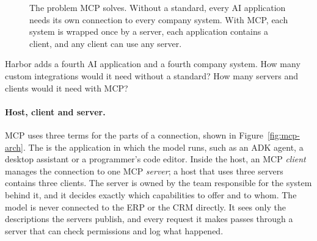 \begin{figure}[htbp]
\caption{The problem MCP solves. Without a standard, every AI application needs its own connection to every company system. With MCP, each system is wrapped once by a server, each application contains a client, and any client can use any server.}
\label{fig:mcp-nm}
\end{figure}

\begin{quickcheck}
Harbor adds a fourth AI application and a fourth company system. How many custom integrations would it need without a standard? How many servers and clients would it need with MCP?
\end{quickcheck}

\paragraph{Host, client and server.} MCP uses three terms for the parts of a connection, shown in Figure~\ref{fig:mcp-arch}. The  is the application in which the model runs, such as an ADK agent, a desktop assistant or a programmer's code editor. Inside the host, an MCP \emph{client} manages the connection to one MCP \emph{server}; a host that uses three servers contains three clients. The server is owned by the team responsible for the system behind it, and it decides exactly which capabilities to offer and to whom. The model is never connected to the ERP or the CRM directly. It sees only the descriptions the servers publish, and every request it makes passes through a server that can check permissions and log what happened.

